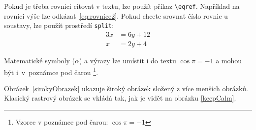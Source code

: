 Pokud je třeba rovnici citovat v textu, lze použít příkaz \verb|\eqref|. Například na rovnici výše lze odkázat~\eqref{eq:rovnice2}. Pokud chcete srovnat číslo rovnic u soustavy, lze použít prostředí \texttt{split}:
\begin{equation} \label{eq:soustavaSrovnana}
\begin{split}
	3x &= 6y + 12 \\
	x &= 2y + 4
\end{split}
\end{equation}

Matematické symboly ($\alpha$) a výrazy lze umístit i do textu $\cos\pi=-1$ a mohou být i~v~poznámce pod čarou%
\footnote{Vzorec v poznámce pod čarou: $\cos\pi=-1$}.

Obrázek~\ref{sirokyObrazek} ukazuje široký obrázek složený z více menších obrázků. Klasický rastrový obrázek se vkládá tak, jak je vidět na obrázku \ref{keepCalm}.

